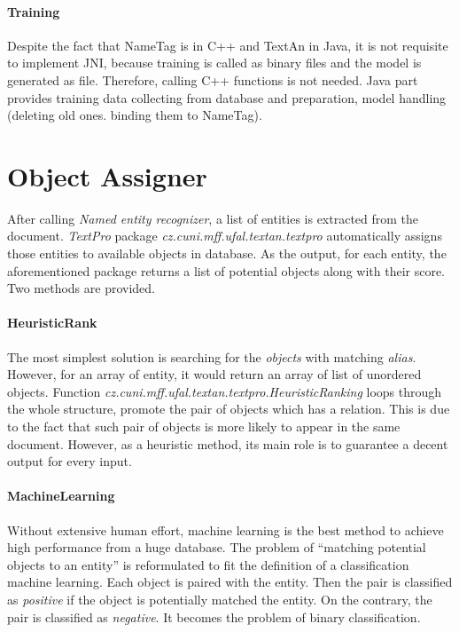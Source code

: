 \paragraph{Training}
Despite the fact that NameTag is in C++ and TextAn in Java, it is not requisite 
to implement JNI, because training is called as binary files and the model is generated
as file. Therefore, calling C++ functions is not needed. Java part provides
training data collecting from database and preparation, model handling
(deleting old ones. binding them to NameTag).

\section{Object Assigner}
\label{sec:ObjectAssigner}


After calling \emph{Named entity recognizer}, a list of entities is extracted from the document. \emph{TextPro}
package \emph{cz.cuni.mff.ufal.textan.textpro} automatically
assigns those entities to available objects in database. As the output, for 
each entity, the aforementioned package returns a list of potential objects along
with their score. Two methods are provided.

\paragraph{HeuristicRank}
The most simplest solution is searching for the \textit{objects} with matching 
\textit{alias}. However, for an array of entity, it would return an array of 
list of unordered objects.
Function \emph{cz.cuni.mff.ufal.textan.textpro.HeuristicRanking} loops through 
the whole structure, promote the pair of objects which has a relation. This is 
due to the fact that such pair of objects is more likely to appear in the same
document. However, as a heuristic method, its main role is to guarantee a decent
output for every input.


\paragraph{MachineLearning}
Without extensive human effort, machine learning is the best method to achieve
high performance from a huge database. The problem of ``matching potential objects
to an entity'' is reformulated to fit the definition of a classification machine 
learning. Each object is paired with the entity. Then the pair is classified as
\emph{positive} if the object is potentially matched the entity. On the contrary,
the pair is classified as \emph{negative}. It becomes the problem of binary 
classification.


